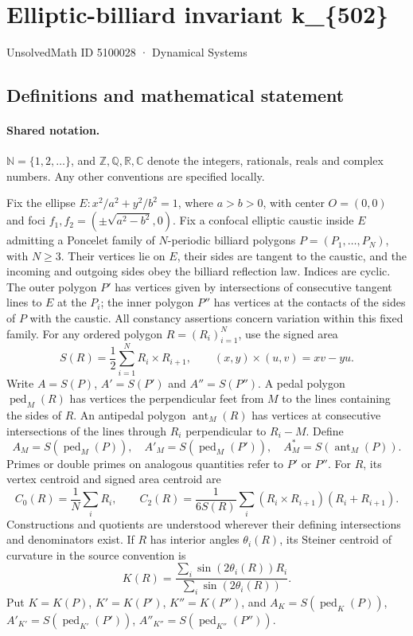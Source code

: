 \documentclass[11pt]{article}
\begin{document}
\setcounter{section}{5100027}
\section{Elliptic-billiard invariant k\_\{502\}}\label{5100028}
{\small\sffamily UnsolvedMath ID 5100028 · Dynamical Systems}
\subsection{Definitions and mathematical statement}

\paragraph{Shared notation.}$\mathbb N=\{1,2,\ldots\}$, and $\mathbb Z,\mathbb Q,\mathbb R,\mathbb C$ denote the integers, rationals, reals and complex numbers. Any other conventions are specified locally.


Fix the ellipse $E:x^2/a^2+y^2/b^2=1$, where $a>b>0$, with center $O=(0,0)$ and foci $f_1,f_2=(\pm\sqrt{a^2-b^2},0)$. Fix a confocal elliptic caustic inside $E$ admitting a Poncelet family of $N$-periodic billiard polygons $P=(P_1,\ldots,P_N)$, with $N\geq3$. Their vertices lie on $E$, their sides are tangent to the caustic, and the incoming and outgoing sides obey the billiard reflection law. Indices are cyclic. The outer polygon $P'$ has vertices given by intersections of consecutive tangent lines to $E$ at the $P_i$; the inner polygon $P''$ has vertices at the contacts of the sides of $P$ with the caustic. All constancy assertions concern variation within this fixed family.
For any ordered polygon $R=(R_i)_{i=1}^N$, use the signed area
\[S(R)=\frac12\sum_{i=1}^N R_i\times R_{i+1},\qquad (x,y)\times(u,v)=xv-yu.\]
Write $A=S(P)$, $A'=S(P')$ and $A''=S(P'')$. A pedal polygon $\operatorname{ped}_M(R)$ has vertices the perpendicular feet from $M$ to the lines containing the sides of $R$. An antipedal polygon $\operatorname{ant}_M(R)$ has vertices at consecutive intersections of the lines through $R_i$ perpendicular to $R_i-M$. Define
\[A_M=S(\operatorname{ped}_M(P)),\quad A'_M=S(\operatorname{ped}_M(P')),\quad A_M^*=S(\operatorname{ant}_M(P)).\]
Primes or double primes on analogous quantities refer to $P'$ or $P''$. For $R$, its vertex centroid and signed area centroid are
\[C_0(R)=\frac1N\sum_i R_i,\qquad C_2(R)=\frac{1}{6S(R)}\sum_i(R_i\times R_{i+1})(R_i+R_{i+1}).\]
Constructions and quotients are understood wherever their defining intersections and denominators exist.
If $R$ has interior angles $\theta_i(R)$, its Steiner centroid of curvature in the source convention is
\[K(R)=\frac{\sum_i\sin(2\theta_i(R))R_i}{\sum_i\sin(2\theta_i(R))}.\]
Put $K=K(P)$, $K'=K(P')$, $K''=K(P'')$, and $A_K=S(\operatorname{ped}_K(P))$, $A'_{K'}=S(\operatorname{ped}_{K'}(P'))$, $A''_{K''}=S(\operatorname{ped}_{K''}(P''))$.
\end{document}
